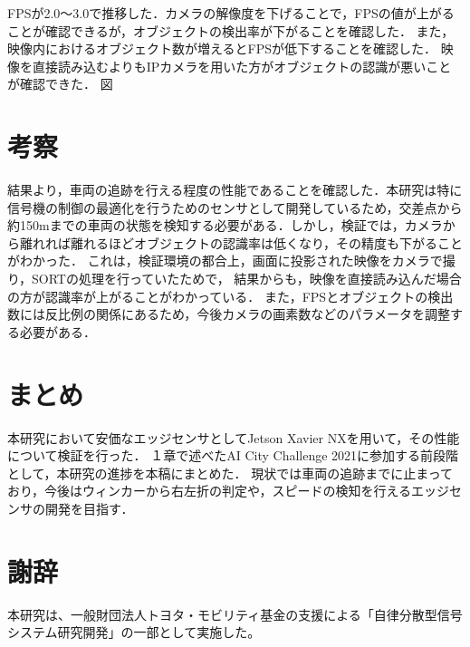 \documentclass[technicalreport]{ieicej}
\begin{document}
FPSが2.0〜3.0で推移した．カメラの解像度を下げることで，FPSの値が上がることが確認できるが，オブジェクトの検出率が下がることを確認した．
また，映像内におけるオブジェクト数が増えるとFPSが低下することを確認した．
映像を直接読み込むよりもIPカメラを用いた方がオブジェクトの認識が悪いことが確認できた．
図
\section{考察}
結果より，車両の追跡を行える程度の性能であることを確認した．本研究は特に信号機の制御の最適化を行うためのセンサとして開発しているため，交差点から
約150mまでの車両の状態を検知する必要がある．しかし，検証では，カメラから離れれば離れるほどオブジェクトの認識率は低くなり，その精度も下がることがわかった．
これは，検証環境の都合上，画面に投影された映像をカメラで撮り，SORTの処理を行っていたためで，
結果からも，映像を直接読み込んだ場合の方が認識率が上がることがわかっている．
また，FPSとオブジェクトの検出数には反比例の関係にあるため，今後カメラの画素数などのパラメータを調整する必要がある．

\section{まとめ}
本研究において安価なエッジセンサとしてJetson Xavier NXを用いて，その性能について検証を行った．
１章で述べたAI City Challenge 2021に参加する前段階として，本研究の進捗を本稿にまとめた．
現状では車両の追跡までに止まっており，今後はウィンカーから右左折の判定や，スピードの検知を行えるエッジセンサの開発を目指す．

\section*{謝辞}
本研究は、一般財団法人トヨタ・モビリティ基金の支援による「自律分散型信号システム研究開発」の一部として実施した。

\end{document}
